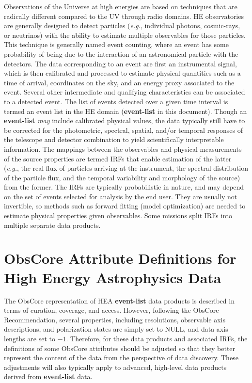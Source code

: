 \documentclass[11pt,a4paper]{ivoa}
\begin{document}
Observations of the Universe at high energies are based on techniques that are radically different compared to the UV through radio domains. HE observatories are generally designed to detect particles ({\em e.g.\/}, individual photons, cosmic-rays, or neutrinos) with the ability to estimate multiple observables for those particles. This technique is generally named event counting, where an event has some probability of being due to the interaction of an astronomical particle with the detectors. The data corresponding to an event are first an instrumental signal, which is then calibrated and processed to estimate physical quantities such as a time of arrival, coordinates on the sky, and an energy proxy associated to the event. Several other intermediate and qualifying characteristics can be associated to a detected event.  The list of events detected over a given time interval is termed an event list in the HE domain ({\bf event-list} in this document). Though an {\bf event-list} {\em may\/} include calibrated physical values, the data typically still have to be corrected for the photometric, spectral, spatial, and/or temporal responses of the telescope and detector combination to yield scientifically interpretable information. The mappings between the observables and physical measurements of the source properties are termed \gls{IRFs} that enable estimation of the latter ({\em e.g.\/}, the real flux of particles arriving at the instrument, the spectral distribution of the particle flux, and the temporal variability and morphology of the source) from the former.  The IRFs are typically probabilistic in nature, and may depend on the set of events selected for analysis by the end user.  They are usually not invertible, so methods such as forward fitting (model optimization) are needed to estimate physical properties given observables.  Some missions split IRFs into multiple separate data products.


\section{ObsCore Attribute Definitions for High Energy Astrophysics Data}

The ObsCore representation of HEA {\bf event-list} data products is described in terms of curation, coverage, and access.  However, following the ObsCore Recommendation, several properties, including resolutions, observable axis descriptions, and polarization states are simply set to NULL, and data axis lengths are set to $-1$.  Therefore, for these data products and associated IRFs, the definitions of some ObsCore attributes should be adjusted so that they better represent the content of the data from the perspective of data discovery.  These adjustments will also typically apply to advanced, high-level data products derived from {\bf event-list} data.
\end{document}
